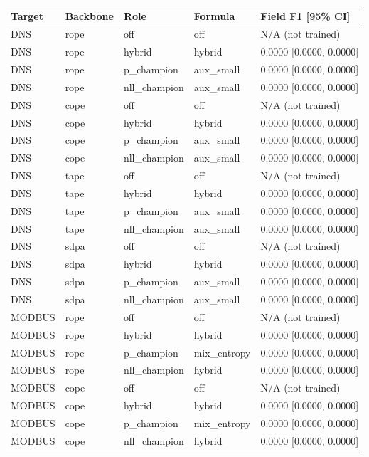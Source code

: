 \begin{tabular}{lllll}
\hline
Target & Backbone & Role & Formula & Field F1 [95\% CI] \\
\hline
DNS & rope & off & off & N/A (not trained) \\
DNS & rope & hybrid & hybrid & 0.0000 [0.0000, 0.0000] \\
DNS & rope & p\_champion & aux\_small & 0.0000 [0.0000, 0.0000] \\
DNS & rope & nll\_champion & aux\_small & 0.0000 [0.0000, 0.0000] \\
DNS & cope & off & off & N/A (not trained) \\
DNS & cope & hybrid & hybrid & 0.0000 [0.0000, 0.0000] \\
DNS & cope & p\_champion & aux\_small & 0.0000 [0.0000, 0.0000] \\
DNS & cope & nll\_champion & aux\_small & 0.0000 [0.0000, 0.0000] \\
DNS & tape & off & off & N/A (not trained) \\
DNS & tape & hybrid & hybrid & 0.0000 [0.0000, 0.0000] \\
DNS & tape & p\_champion & aux\_small & 0.0000 [0.0000, 0.0000] \\
DNS & tape & nll\_champion & aux\_small & 0.0000 [0.0000, 0.0000] \\
DNS & sdpa & off & off & N/A (not trained) \\
DNS & sdpa & hybrid & hybrid & 0.0000 [0.0000, 0.0000] \\
DNS & sdpa & p\_champion & aux\_small & 0.0000 [0.0000, 0.0000] \\
DNS & sdpa & nll\_champion & aux\_small & 0.0000 [0.0000, 0.0000] \\
MODBUS & rope & off & off & N/A (not trained) \\
MODBUS & rope & hybrid & hybrid & 0.0000 [0.0000, 0.0000] \\
MODBUS & rope & p\_champion & mix\_entropy & 0.0000 [0.0000, 0.0000] \\
MODBUS & rope & nll\_champion & hybrid & 0.0000 [0.0000, 0.0000] \\
MODBUS & cope & off & off & N/A (not trained) \\
MODBUS & cope & hybrid & hybrid & 0.0000 [0.0000, 0.0000] \\
MODBUS & cope & p\_champion & mix\_entropy & 0.0000 [0.0000, 0.0000] \\
MODBUS & cope & nll\_champion & hybrid & 0.0000 [0.0000, 0.0000] \\

\end{tabular}
